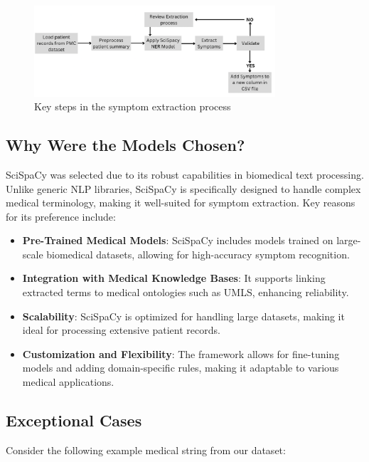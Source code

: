 \begin{figure}[h]
    \centering
    \includegraphics[width=0.8\textwidth]{fig/symptom_extraction.png}  
    \caption{Key steps in the symptom extraction process}
    \label{fig:symptom_extraction}
\end{figure}

\subsection{Why Were the Models Chosen?}

SciSpaCy was selected due to its robust capabilities in biomedical text processing. Unlike generic NLP libraries, SciSpaCy is specifically designed to handle complex medical terminology, making it well-suited for symptom extraction. Key reasons for its preference include:

\begin{itemize}
    \item \textbf{Pre-Trained Medical Models}: SciSpaCy includes models trained on large-scale biomedical datasets, allowing for high-accuracy symptom recognition.
    \item \textbf{Integration with Medical Knowledge Bases}: It supports linking extracted terms to medical ontologies such as UMLS, enhancing reliability.
    \item \textbf{Scalability}: SciSpaCy is optimized for handling large datasets, making it ideal for processing extensive patient records.
    \item \textbf{Customization and Flexibility}: The framework allows for fine-tuning models and adding domain-specific rules, making it adaptable to various medical applications.
\end{itemize}

\subsection{Exceptional Cases}
Consider the following example medical string from our dataset:

